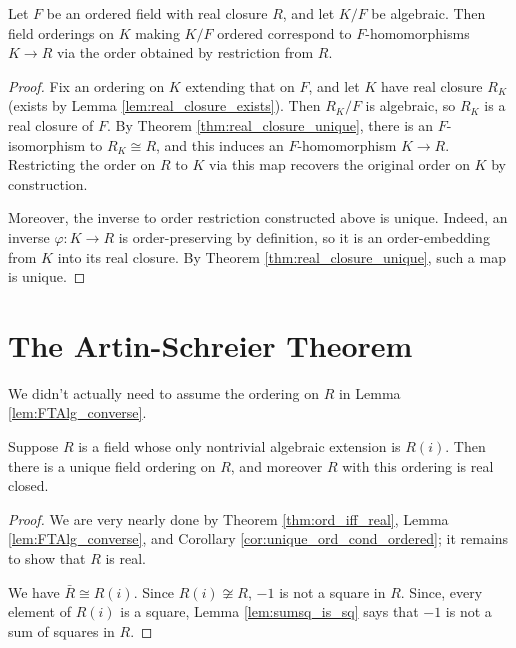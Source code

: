 \begin{lemma}
  \label{lem:ord_alg_ext_eq_emb}
  Let $F$ be an ordered field with real closure $R$, and let $K/F$ be algebraic. Then field orderings on $K$ making $K/F$ ordered correspond to $F$-homomorphisms $K\to R$ via the order obtained by restriction from $R$.
\end{lemma}
\begin{proof}
  Fix an ordering on $K$ extending that on $F$, and let $K$ have real closure $R_K$ (exists by Lemma \ref{lem:real_closure_exists}). Then $R_K/F$ is algebraic, so $R_K$ is a real closure of $F$. By Theorem \ref{thm:real_closure_unique}, there is an $F$-isomorphism to $R_K\cong R$, and this induces an $F$-homomorphism $K\to R$. Restricting the order on $R$ to $K$ via this map recovers the original order on $K$ by construction.
  
  Moreover, the inverse to order restriction constructed above is unique. Indeed, an inverse $\varphi:K\to R$ is order-preserving by definition, so it is an order-embedding from $K$ into its real closure. By Theorem \ref{thm:real_closure_unique}, such a map is unique.
\end{proof}

\section{The Artin-Schreier Theorem}

We didn't actually need to assume the ordering on $R$ in Lemma \ref{lem:FTAlg_converse}.

\begin{lemma}
  \label{lem:FTAlg_converse_strong}
  Suppose $R$ is a field whose only nontrivial algebraic extension is $R(i)$. Then there is a unique field ordering on $R$, and moreover $R$ with this ordering is real closed.
\end{lemma}
\begin{proof}
  We are very nearly done by Theorem \ref{thm:ord_iff_real}, Lemma \ref{lem:FTAlg_converse}, and Corollary \ref{cor:unique_ord_cond_ordered}; it remains to show that $R$ is real.

  We have $\bar{R}\cong R(i)$. Since $R(i)\not\cong R$, $-1$ is not a square in $R$. Since, every element of $R(i)$ is a square, Lemma \ref{lem:sumsq_is_sq} says that $-1$ is not a sum of squares in $R$.
\end{proof}


